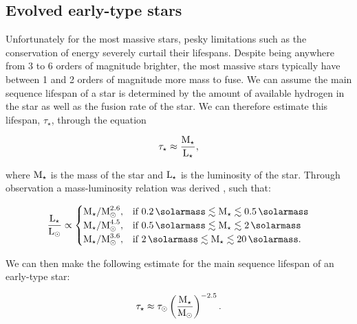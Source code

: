 \subsection{Evolved early-type stars}
\label{sec:evolvedstars}
Unfortunately for the most massive stars, pesky limitations such as the conservation of energy severely curtail their lifespans.
Despite being anywhere from 3 to 6 orders of magnitude brighter, the most massive stars typically have between 1 and 2 orders of magnitude more mass to fuse.
We can assume the main sequence lifespan of a star is determined by the amount of available hydrogen in the star as well as the fusion rate of the star.
We can therefore estimate this lifespan, $\tau_\star$, through the equation

\begin{equation}
  \tau_\star \approx \frac{\text{M}_\star}{\text{L}_\star} ,
\end{equation}

\noindent
where $\text{M}_\star$ is the mass of the star and $\text{L}_\star$ is the luminosity of the star.
Through observation a mass-luminosity relation was derived \parencite[139]{salarisEvolutionStarsStellar2005}, such that:

\begin{equation}
  \frac{\lumin_\star}{\lumin\sol} \propto
  \begin{cases}
    \mass_\star / \mass\sol^{2.6} , & \text{if } \SI{0.2}{\solarmass} \lesssim \mass_\star \lesssim \SI{0.5}{\solarmass} \\
    \mass_\star / \mass\sol^{4.5} , & \text{if } \SI{0.5}{\solarmass} \lesssim \mass_\star \lesssim \SI{2}{\solarmass} \\
    \mass_\star / \mass\sol^{3.6} , & \text{if } \SI{2}{\solarmass} \lesssim \mass_\star \lesssim \SI{20}{\solarmass} .
  \end{cases}
\end{equation}

\noindent
We can then make the following estimate for the main sequence lifespan of an early-type star:

\begin{equation}
  \label{eq:mass-lifespan}
  \tau_\star \approx \tau_{\odot} \left(\frac{\text{M}_\star}{\text{M}_{\odot}}\right)^{-2.5}.
\end{equation}

